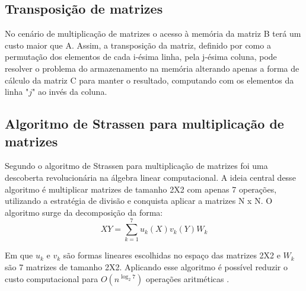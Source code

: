 \documentclass[12pt]{article}
\begin{document}
\subsection{Transposição de matrizes}
\par
No cenário de multiplicação de matrizes o acesso à memória da matriz B terá um custo maior que A. Assim, a transposição da matriz, definido por \cite{cormen2012} como a permutação dos elementos de cada i-ésima linha, pela j-ésima coluna, pode resolver o problema do armazenamento na memória alterando apenas a forma de cálculo da matriz C para manter o resultado, computando com os elementos da linha "$j$" ao invés da coluna. 

\subsection{Algoritmo de Strassen para multiplicação de matrizes}
Segundo \cite{ikenmeyer2019strassen} o algoritmo de Strassen para multiplicação de matrizes foi uma descoberta revolucionária na álgebra linear computacional. A ideia central desse algoritmo é multiplicar matrizes de tamanho 2X2 com apenas 7 operações, utilizando a estratégia de divisão e conquista aplicar a matrizes N x N. O algoritmo surge da decomposição da forma: 
\begin{equation}
XY = \sum_{k=1}^{7} u_{k}(X)v_{k}(Y)W_{k}
\end{equation}
\par
Em que $u_k$ e $v_k$ são formas lineares escolhidas no espaço das matrizes 2X2 e $W_k$ são 7 matrizes de tamanho 2X2. Aplicando esse algoritmo é possível reduzir o custo computacional para $O(n^{\log_{2}7})$ operações aritméticas \cite{ikenmeyer2019strassen}.
\end{document}
